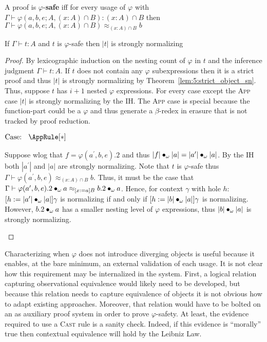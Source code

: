 \begin{definition}
    A proof is $\varphi$-\textbf{safe} iff for every usage of $\varphi$ with $\Gamma \vdash \varphi(a, b, e; A, (x : A) \cap B) : (x : A) \cap B$ then $\Gamma \vdash \varphi(a, b, e; A, (x : A) \cap B) \approx_{(x : A) \cap B} b$
\end{definition}

\begin{theorem}
    If $\Gamma \vdash t : A$ and $t$ is $\varphi$-safe then $|t|$ is strongly normalizing
\end{theorem}
\begin{proof}
    By lexicographic induction on the nesting count of $\varphi$ in $t$ and the inference judgment $\Gamma \vdash t : A$.
    If $t$ does not contain any $\varphi$ subexpressions then it is a strict proof and thus $|t|$ is strongly normalizing by Theorem~\ref{lem:5:strict_object_sn}.
    Thus, suppose $t$ has $i + 1$ nested $\varphi$ expressions.
    For every case except the \textsc{App} case $|t|$ is strongly normalizing by the IH.
    The \textsc{App} case is special because the function-part could be a $\varphi$ and thus generate a $\beta$-redex in erasure that is not tracked by proof reduction.

    $\text{Case: }\begin{array}{c} \AppRule[*] \end{array}$
    \begin{proofcase}
        Suppose wlog that $f = \varphi(a^\prime, b, e).2$ and thus $|f| \bullet_{\omega} |a| = |a^\prime| \bullet_{\omega} |a|$.
        By the IH both $|a^\prime|$ and $|a|$ are strongly normalizing.
        Note that $t$ is $\varphi$-safe thus $\Gamma \vdash \varphi(a^\prime, b, e) \approx_{(x : A) \cap B} b$.
        Thus, it must be the case that $\Gamma \vdash \varphi(a^\prime, b, e).2 \bullet_{\omega} a \approx_{[x := a]B} b.2 \bullet_{\omega} a$.
        Hence, for context $\gamma$ with hole $h$: $[h := |a^\prime| \bullet_{\omega} |a|]\gamma$ is normalizing if and only if $[h := |b| \bullet_{\omega} |a|]\gamma$ is normalizing.
        However, $b.2 \bullet_{\omega} a$ has a smaller nesting level of $\varphi$ expressions, thus $|b| \bullet_{\omega} |a|$ is strongly normalizing.
    \end{proofcase}
\end{proof}

Characterizing when $\varphi$ does not introduce diverging objects is useful because it enables, at the bare minimum, an external validation of each usage.
It is not clear how this requirement may be internalized in the system.
First, a logical relation capturing observational equivalence would likely need to be developed, but because this relation needs to capture equivalence of objects it is not obvious how to adapt existing approaches.
Moreover, that relation would have to be bolted on an as auxiliary proof system in order to prove $\varphi$-safety.
At least, the evidence required to use a \textsc{Cast} rule is a sanity check.
Indeed, if this evidence is ``morally'' true then contextual equivalence will hold by the Leibniz Law.

